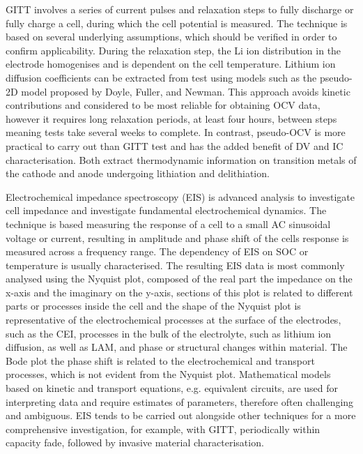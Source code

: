 \documentclass[aps,prb,twocolumn,superscriptaddress,reprint]{revtex4-1}
\begin{document}
GITT involves a series of current pulses and relaxation steps to fully discharge or fully charge a cell, during which the cell potential is measured.\cite{Dees2009} The technique is based on several underlying assumptions, which should be verified in order to confirm applicability.\cite{Dees2009} During the relaxation step, the Li ion distribution in the electrode homogenises and is dependent on the cell temperature. Lithium ion diffusion coefficients can be extracted from test using models such as the pseudo-2D model proposed by Doyle, Fuller, and Newman. \cite{Doyle1993DFN} This approach avoids kinetic contributions and considered to be most reliable for obtaining OCV data, however it requires long relaxation periods, at least four hours, between steps meaning tests take several weeks to complete. In contrast, pseudo-OCV is more practical to carry out than GITT test and has the added benefit of DV and IC characterisation. Both extract thermodynamic information on transition metals of the cathode and anode undergoing lithiation and delithiation.

Electrochemical impedance spectroscopy (EIS) is advanced analysis to investigate cell impedance and investigate fundamental electrochemical dynamics. The technique is based measuring the response of a cell to a small AC sinusoidal voltage or current, resulting in amplitude and phase shift of the cells response is measured across a frequency range. The dependency of EIS on SOC or temperature is usually characterised.\cite{Andre2011} The resulting EIS data is most commonly analysed using the Nyquist plot, composed of the real part the impedance on the x-axis and the imaginary on the y-axis, sections of this plot is related to different parts or processes inside the cell and the shape of the Nyquist plot is representative of the electrochemical processes at the surface of the electrodes, such as the CEI, processes in the bulk of the electrolyte, such as lithium ion diffusion, as well as LAM, and phase or structural changes within material.\cite{Jalkanen2015, Andre2011}
The Bode plot the phase shift is related to the electrochemical and transport processes, which is not evident from the Nyquist plot. Mathematical models based on kinetic and transport equations, e.g. equivalent circuits, are used for interpreting data and require estimates of parameters, therefore often challenging and ambiguous. EIS tends to be carried out alongside other techniques for a more comprehensive investigation, for example, with GITT, periodically within capacity fade, followed by invasive material characterisation. \cite{Jalkanen2015}
\end{document}
